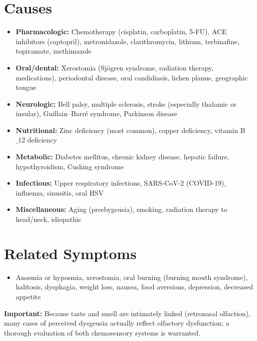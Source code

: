 \section*{Causes}
\begin{itemize}
  \item \textbf{Pharmacologic:} Chemotherapy (cisplatin, carboplatin, 5-FU), ACE inhibitors (captopril), metronidazole, clarithromycin, lithium, terbinafine, topiramate, methimazole
  \item \textbf{Oral/dental:} Xerostomia (Sj\"{o}gren syndrome, radiation therapy, medications), periodontal disease, oral candidiasis, lichen planus, geographic tongue
  \item \textbf{Neurologic:} Bell palsy, multiple sclerosis, stroke (especially thalamic or insular), Guillain--Barr\'{e} syndrome, Parkinson disease
  \item \textbf{Nutritional:} Zinc deficiency (most common), copper deficiency, vitamin B\(\_{12}\) deficiency
  \item \textbf{Metabolic:} Diabetes mellitus, chronic kidney disease, hepatic failure, hypothyroidism, Cushing syndrome
  \item \textbf{Infectious:} Upper respiratory infections, SARS-CoV-2 (COVID-19), influenza, sinusitis, oral HSV
  \item \textbf{Miscellaneous:} Aging (presbygeusia), smoking, radiation therapy to head/neck, idiopathic
\end{itemize}

\section*{Related Symptoms}
\begin{itemize}
  \item Anosmia or hyposmia, xerostomia, oral burning (burning mouth syndrome), halitosis, dysphagia, weight loss, nausea, food aversions, depression, decreased appetite
\end{itemize}
\textbf{Important:} Because taste and smell are intimately linked (retronasal olfaction), many cases of perceived dysgeusia actually reflect olfactory dysfunction; a thorough evaluation of both chemosensory systems is warranted.


